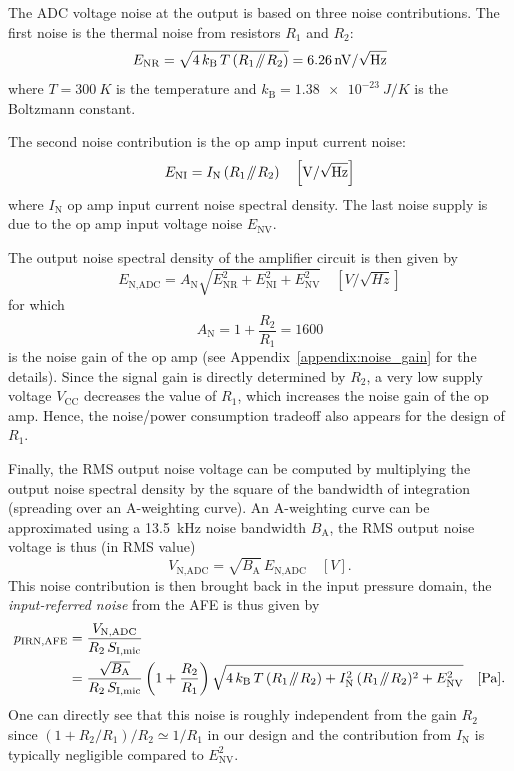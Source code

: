 \documentclass{EPL-master-thesis-covers-EN}
\newcommand{\parallelsum}{\mathbin{\!/\mkern-5mu/\!}}
\newcommand{\te}[1]{\textrm{#1}}
\begin{document}
The ADC voltage noise at the output is based on three noise contributions. The first noise is the thermal noise from resistors $R_1$ and $R_2$:
\[
 E_\te{NR} = \sqrt{4 \, k_\te{B} \, T \, (R_1 \parallelsum R_2)} = \SI{6.26}{nV/\sqrt{Hz}}
\]
where $T = \SI{300}{K}$ is the temperature and $k_\te{B} = \SI{1.38e-23}{J/K}$ is the Boltzmann constant.

The second noise contribution is the op amp input current noise:
\[
 E_\te{NI} = I_\te{N} \, (R_1 \parallelsum R_2) \quad \left[\si{V/\sqrt{Hz}}\right]
\]
where $I_\te{N}$ op amp input current noise spectral density. The last noise supply is due to the op amp input voltage noise $E_\te{NV}$.

The output noise spectral density of the amplifier circuit is then given by
\[
 E_\te{N,ADC} = A_\te{N} \sqrt{E_\te{NR}^2 + E_\te{NI}^2 + E_\te{NV}^2} \quad \left[\si{V/\sqrt{Hz}}\right]
\]
for which
\[
 A_\te{N} = 1 + \frac{R_2}{R_1} = 1600
\]
is the noise gain of the op amp (see Appendix~\ref{appendix:noise_gain} for the details). Since the signal gain is directly determined by $R_2$, a very low supply voltage $V_\te{CC}$ decreases the value of $R_1$, which increases the noise gain of the op amp. Hence, the noise/power consumption tradeoff also appears for the design of $R_1$.

Finally, the RMS output noise voltage can be computed by multiplying the output noise spectral density by the square of the bandwidth of integration (spreading over an A-weighting curve). An A-weighting curve can be approximated using a \SI{13.5}{kHz} noise bandwidth $B_\te{A}$, the RMS output noise voltage is thus (in RMS value)
\[
 V_\te{N,ADC} = \sqrt{B_\te{A}} \, E_\te{N,ADC} \quad [\si{V}].
\]
This noise contribution is then brought back in the input pressure domain, the \textit{input-referred noise} from the AFE is thus given by
\begin{align*}
  p_\te{IRN,AFE} &= \frac{V_\te{N,ADC}}{R_2\,S_{\te{I,mic}}}\\
   &= \frac{\sqrt{B_\te{A}}}{R_2\,S_{\te{I,mic}}} \left(1 + \frac{R_2}{R_1}\right) \sqrt{4 \, k_\te{B} \, T \, (R_1 \parallelsum R_2) + I_\te{N}^2 \, (R_1 \parallelsum R_2)^2 + E_\te{NV}^2} \quad \si{[Pa]}.
\end{align*}
One can directly see that this noise is roughly independent from the gain $R_2$ since $(1+R_2/R_1)/R_2\simeq 1/R_1$ in our design and the contribution from $I_\te{N}$ is typically negligible compared to $E_\te{NV}^2$.

\end{document}
